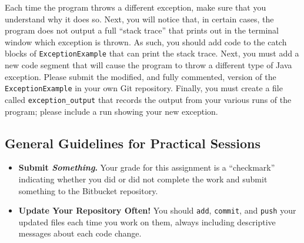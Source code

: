 Each time the program throws a different exception, make sure that you understand why it does so. Next, you will notice
that, in certain cases, the program does not output a full ``stack trace'' that prints out in the terminal window which
exception is thrown. As such, you should add code to the catch blocks of {\tt ExceptionExample} that can print the stack
trace. Next, you must add a new code segment that will cause the program to throw a different type of Java exception.
Please submit the modified, and fully commented, version of the {\tt ExceptionExample} in your own Git repository.
Finally, you must create a file called {\tt exception\_output} that records the output from your various runs of the
program; please include a run showing your new exception.


\vspace*{-.15in}
\subsection*{General Guidelines for Practical Sessions}
\vspace*{-.05in}

\begin{itemize}
  \itemsep 0in

\item {\bf Submit \textbf{\textit{Something}}.} Your grade for this assignment is a ``checkmark'' indicating whether you
  did or did not complete the work and submit something to the Bitbucket repository.

\item {\bf Update Your Repository Often!} You should {\tt add}, {\tt commit}, and {\tt push} your updated files each
  time you work on them, always including descriptive messages about each code change.


\end{itemize}


